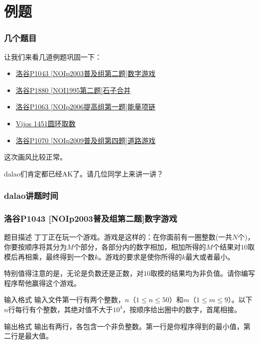\documentclass[UTF-8,aspectratio=1610]{ctexbeamer}
\begin{document}
\section{例题}
\begin{frame}
\frametitle{几个题目}
让我们来看几道例题巩固一下：
\begin{itemize}
\item{\href{https://www.luogu.org/problemnew/show/P1880}{洛谷P1043 [NOIp2003普及组第二题]数字游戏}}
\item{\href{https://www.luogu.org/problemnew/show/P1880}{洛谷P1880 [NOI1995第二题]石子合并}}
\item{\href{https://www.luogu.org/problemnew/show/P1063}{洛谷P1063 [NOIp2006提高组第一题]能量项链}}
\item{\href{https://www.vijos.org/p/1451}{Vijos 1451圆环取数}}
\item{\href{https://www.luogu.org/problemnew/show/P1070}{洛谷P1070 [NOIp2009普及组第四题]道路游戏}}
\end{itemize}\pause
这次画风比较正常。\pause

dalao们肯定都已经AK了。请几位同学上来讲一讲？
\end{frame}
\begin{frame}
\frametitle{dalao讲题时间}
\end{frame}
\begin{frame}
\frametitle{洛谷P1043 [NOIp2003普及组第二题]数字游戏}
\begin{block}{题目描述}
丁丁正在玩一个游戏。游戏是这样的：在你面前有一圈整数(一共$N$个)，你要按顺序将其分为$M$个部分，各部分内的数字相加，相加所得的$M$个结果对$10$取模后再相乘，最终得到一个数$k$。游戏的要求是使你所得的$k$最大或者最小。

特别值得注意的是，无论是负数还是正数，对$10$取模的结果均为非负值。请你编写程序帮他赢得这个游戏。
\end{block}
\begin{alertblock}{输入格式}
输入文件第一行有两个整数，$n$（$1\leqslant n\leqslant 50$）和$m$（$1\leqslant m\leqslant 9$）。以下$n$行每行有个整数，其绝对值不大于$10^4$，按顺序给出圈中的数字，首尾相接。
\end{alertblock}
\begin{exampleblock}{输出格式}
输出有两行，各包含一个非负整数。第一行是你程序得到的最小值，第二行是最大值。
\end{exampleblock}
\end{frame}
\end{document}
